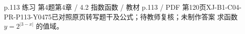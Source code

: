 \par\noindent\begin{minipage}{\linewidth}
\begin{bankitem}{p.113 练习 第4题}{第4章 / 4.2 指数函数 / 教材 p.113 / PDF 第120页}{XJ-B1-C04-PR-P113-Y0475}{已对照原页转写题干及公式；待教师复核；未制作答案}
求函数 $y=2^{|3-x|}$ 的值域。
\end{bankitem}
\end{minipage}\par\medskip
